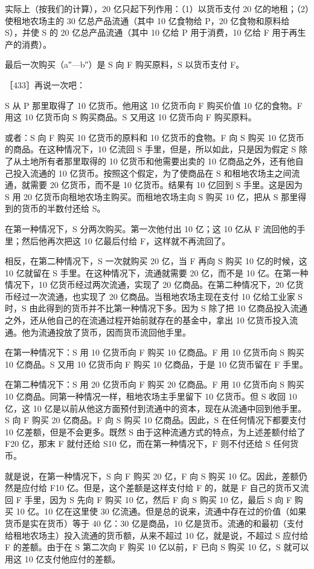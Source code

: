 实际上（按我们的计算），20 亿只起下列作用：（1）以货币支付 20 亿的地租；（2）使租地农场主的 30 亿总产品流通（其中 10 亿食物给 P，20 亿食物和原料给 S），并使 S 的 20 亿总产品流通（其中 10 亿给 P 用于消费，10 亿给 F 用于再生产的消费）。

最后一次购买（a″—b″）是 S 向 F 购买原料，S 以货币支付 F。

［433］再说一次吧：

S 从 P 那里取得了 10 亿货币。他用这 10 亿货币向 F 购买价值 10 亿的食物。F 用这 10 亿货币向 S 购买商品。S 又用这 10 亿货币向 F 购买原料。

或者：S 向 F 购买 10 亿货币的原料和 10 亿货币的食物。F 向 S 购买 10 亿货币的商品。在这种情况下，10 亿流回 S 手里，但是，所以如此，只是因为假定 S 除了从土地所有者那里取得的 10 亿货币和他需要出卖的 10 亿商品之外，还有他自己投入流通的 10 亿货币。按照这个假定，为了使商品在 S 和租地农场主之间流通，就需要 20 亿货币，而不是 10 亿货币。结果有 10 亿回到 S 手里。这是因为 S 用 20 亿货币向租地农场主购买。而租地农场主向 S 购买 10 亿，把从 S 那里得到的货币的半数付还给 S。

在第一种情况下，S 分两次购买。第一次他付出 10 亿；这 10 亿从 F 流回他的手里；然后他再次把这 10 亿最后付给 F，这样就不再流回了。

相反，在第二种情况下，S 一次就购买 20 亿，当 F 再向 S 购买 10 亿的时候，这 10 亿就留在 S 手里。在这种情况下，流通就需要 20 亿，而不是 10 亿。在第一种情况下，10 亿货币经过两次流通，实现了 20 亿商品。在第二种情况下，20 亿货币经过一次流通，也实现了 20 亿商品。当租地农场主现在支付 10 亿给工业家 S 时，S 由此得到的货币并不比第一种情况下多。因为 S 除了把 10 亿商品投入流通之外，还从他自己的在流通过程开始前就存在的基金中，拿出 10 亿货币投入流通。他为流通投放了货币，因而货币流回他手里。

在第一种情况下：S 用 10 亿货币向 F 购买 10 亿商品。F 用 10 亿货币向 S 购买 10 亿商品。S 又用 10 亿货币向 F 购买 10 亿商品，于是 10 亿货币留在 F 手里。

在第二种情况下：S 用 20 亿货币向 F 购买 20 亿商品。F 用 10 亿货币向 S 购买 10 亿商品。同第一种情况一样，租地农场主手里留下 10 亿货币。但 S 收回 10 亿，这 10 亿是以前从他这方面预付到流通中的资本，现在从流通中回到他手里。S 向 F 购买 20 亿商品。F 向 S 购买 10 亿商品。因此，S 在任何情况下都要支付 10 亿差额，但是不会更多。既然 S 由于这种流通方式的特点，为上述差额付给了 F20 亿，那末 F 就付还给 S10 亿，而在第一种情况下，F 则不付还给 S 任何货币。

就是说，在第一种情况下，S 向 F 购买 20 亿，F 向 S 购买 10 亿。因此，差额仍然是应付给 F10 亿。但是，这个差额是这样支付给 F 的，就是 F 自己的货币又流回 F 手里，因为 S 先向 F 购买 10 亿，然后 F 向 S 购买 10 亿，最后 S 向 F 购买 10 亿。10 亿在这里使 30 亿流通。但是总的说来，流通中存在过的价值（如果货币是实在货币）等于 40 亿：30 亿是商品，10 亿是货币。流通的和最初（支付给租地农场主）投入流通的货币额，从来不超过 10 亿，就是说，不超过 S 应付给 F 的差额。由于在 S 第二次向 F 购买 10 亿以前，F 已向 S 购买 10 亿，S 就可以用这 10 亿支付他应付的差额。

